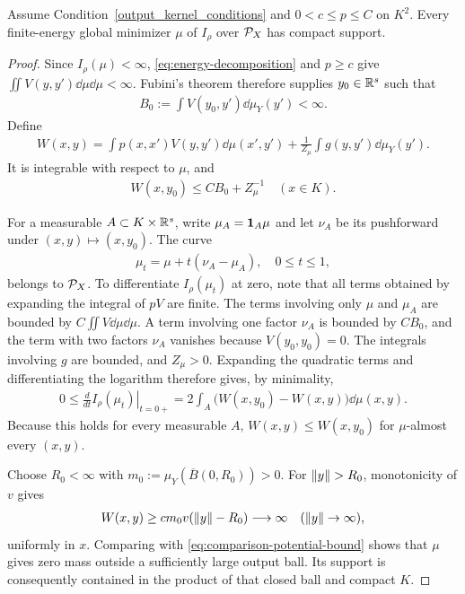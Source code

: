 \begin{proposition}\label{prop:compact-support}
Assume Condition~\ref{output_kernel_conditions} and $0<c\leq p\leq C$ on $K^2$. Every finite-energy global minimizer $\mu$ of $I_\rho$ over $\mathcal P_X$ has compact support.
\end{proposition}
\begin{proof}
Since $I_\rho(\mu)<\infty$, \eqref{eq:energy-decomposition} and $p\geq c$ give $\iint V(y,y')\dd\mu\dd\mu<\infty$. Fubini's theorem therefore supplies $y_0\in\mathbb{R}^s$ such that
\begin{align}
B_0:=\int V(y_0,y')\dd\mu_Y(y')<\infty.
\end{align}
Define
\begin{align}\label{eq:first-variation-potential}
W(x,y)=\int p(x,x')V(y,y')\dd\mu(x',y')
+\frac1{Z_\mu}\int g(y,y')\dd\mu_Y(y').
\end{align}
It is integrable with respect to $\mu$, and
\begin{align}\label{eq:comparison-potential-bound}
W(x,y_0)\leq C B_0+Z_\mu^{-1}\quad(x\in K).
\end{align}

For a measurable $A\subset K\times\mathbb{R}^s$, write $\mu_A=\mathbf 1_A\mu$ and let $\nu_A$ be its pushforward under $(x,y)\mapsto(x,y_0)$. The curve
\begin{align}
\mu_t=\mu+t(\nu_A-\mu_A),\quad 0\leq t\leq1,
\end{align}
belongs to $\mathcal P_X$. To differentiate $I_\rho(\mu_t)$ at zero, note that all terms obtained by expanding the integral of $pV$ are finite. The terms involving only $\mu$ and $\mu_A$ are bounded by $C\iint V\dd\mu\dd\mu$. A term involving one factor $\nu_A$ is bounded by $CB_0$, and the term with two factors $\nu_A$ vanishes because $V(y_0,y_0)=0$. The integrals involving $g$ are bounded, and $Z_\mu>0$. Expanding the quadratic terms and differentiating the logarithm therefore gives, by minimality,
\begin{align}\label{eq:redistribution-variation}
0\leq\left.\frac{d}{dt}I_\rho(\mu_t)\right|_{t=0+}
=2\int_A\bigl(W(x,y_0)-W(x,y)\bigr)\dd\mu(x,y).
\end{align}
Because this holds for every measurable $A$, $W(x,y)\leq W(x,y_0)$ for $\mu$-almost every $(x,y)$.

Choose $R_0<\infty$ with $m_0:=\mu_Y(\overline B(0,R_0))>0$. For $\left\lVert y\right\rVert>R_0$, monotonicity of $v$ gives
\begin{align}\label{eq:potential-divergence}
W(x,y)\geq c m_0 v(\left\lVert y\right\rVert-R_0)\longrightarrow\infty
\quad(\left\lVert y\right\rVert\to\infty),
\end{align}
uniformly in $x$. Comparing with \eqref{eq:comparison-potential-bound} shows that $\mu$ gives zero mass outside a sufficiently large output ball. Its support is consequently contained in the product of that closed ball and compact $K$.
\end{proof}

